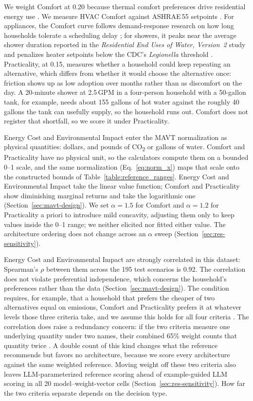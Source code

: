 \documentclass[final,3p,times]{elsarticle}
\begin{document}
We weight Comfort at 0.20 because thermal comfort preferences drive residential energy use \cite{sintov2019}. We measure HVAC Comfort against ASHRAE\,55 setpoints \cite{ashrae55_2020}. For appliances, the Comfort curve follows demand-response research on how long households tolerate a scheduling delay \cite{paetz2012,waseem2020}; for showers, it peaks near the average shower duration reported in the \textit{Residential End Uses of Water, Version~2} study \cite{reu2016} and penalizes heater setpoints below the CDC's \textit{Legionella} threshold \cite{cdc2026}. Practicality, at 0.15, measures whether a household could keep repeating an alternative, which differs from whether it would choose the alternative once: friction shows up as low adoption over months rather than as discomfort on the day. A 20-minute shower at 2.5\,GPM in a four-person household with a 50-gallon tank, for example, needs about 155 gallons of hot water against the roughly 40 gallons the tank can usefully supply, so the household runs out. Comfort does not register that shortfall, so we score it under Practicality.

Energy Cost and Environmental Impact enter the MAVT normalization as physical quantities: dollars, and pounds of CO\textsubscript{2} or gallons of water. Comfort and Practicality have no physical unit, so the calculators compute them on a bounded 0--1 scale, and the same normalization (Eq.~\ref{eq:norm_x}) maps that scale onto the constructed bounds of Table~\ref{table:reference_ranges}. Energy Cost and Environmental Impact take the linear value function; Comfort and Practicality show diminishing marginal returns and take the logarithmic one (Section~\ref{sec:mavt-design}). We set $\alpha = 1.5$ for Comfort and $\alpha = 1.2$ for Practicality a priori to introduce mild concavity, adjusting them only to keep values inside the 0--1 range; we neither elicited nor fitted either value. The architecture ordering does not change across an $\alpha$ sweep (Section~\ref{sec:res-sensitivity}).

Energy Cost and Environmental Impact are strongly correlated in this dataset: Spearman's $\rho$ between them across the 195 test scenarios is 0.92. The correlation does not violate preferential independence, which concerns the household's preferences rather than the data (Section~\ref{sec:mavt-design}). The condition requires, for example, that a household that prefers the cheaper of two alternatives equal on emissions, Comfort and Practicality prefers it at whatever levels those three criteria take, and we assume this holds for all four criteria \cite{keeneyraiffa1976,dyer1979}. The correlation does raise a redundancy concern: if the two criteria measure one underlying quantity under two names, their combined 65\% weight counts that quantity twice \cite{keeneyraiffa1976}. A double count of this kind changes what the reference recommends but favors no architecture, because we score every architecture against the same weighted reference. Moving weight off these two criteria also leaves LLM-parameterized reference scoring ahead of example-guided LLM scoring in all 20 model--weight-vector cells (Section~\ref{sec:res-sensitivity}). How far the two criteria separate depends on the decision type.
\end{document}
